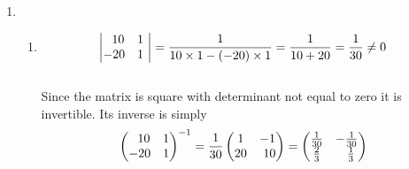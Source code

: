 \documentclass[12pt]{amsart}
\begin{document}
\begin{enumerate}
\begin{enumerate}
		\end{enumerate}
								
	\item 
	
		\begin{enumerate}
		
			\item 
			\begin{align}
				\begin{vmatrix}
					\text{ }\text{ }10 &1 \text{ } \\
					-20 &1 \text{ } 
				\end{vmatrix}=\frac{1}{10\times1-(-20)\times1}=\frac{1}{10+20} =\frac{1}{30} \ne 0 \notag
			\end{align} \\
			Since the matrix is square with determinant not equal to zero it is invertible.  Its inverse is 
			simply
			\begin{align}
				\begin{pmatrix}
					\text{ }\text{ }10 &1 \\
					-20 &1
				\end{pmatrix}^{-1}=
				\frac{1}{30} 
				\begin{pmatrix}
					1 &-1 \\
					20 &\text{ } 10
				\end{pmatrix}=
				\begin{pmatrix}
					\frac{1}{30} &-\frac{1}{30} \\
					\frac{2}{3} &\text{ } \text{ } \frac{1}{3}
				\end{pmatrix} \notag
			\end{align}
																

\end{enumerate}
\end{enumerate}
\end{document}
